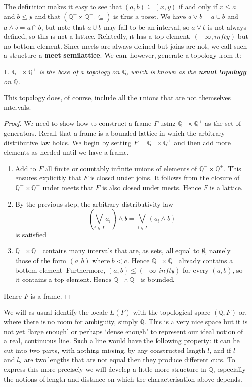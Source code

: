 \documentclass[oneside,english]{amsbook}
\numberwithin{section}{chapter}
\theoremstyle{plain}
\newtheorem{thm}{\protect\theoremname}
\theoremstyle{definition}
\providecommand{\theoremname}{Theorem}
\begin{document}
The definition makes it easy to see that $(a, b)\subseteq (x, y)$ if and only if $x\le a$ and $b\le y$ and that $(\mathbb{Q}^-\times\mathbb{Q}^+, \subseteq)$ is thus a poset. We have $a\lor b = a\cup b$ and $a\land b = a\cap b$, but note that $a\cup b$ may fail to be an interval, so $a\lor b$ is not always defined, so this is not a lattice. Relatedly, it has a top element, $(-\infty, infty)$ but no bottom element. Since meets are always defined but joins are not, we call such a structure a \textbf{meet semilattice}. We can, however, generate a topology from it:

\begin{thm}$\mathbb{Q}^-\times\mathbb{Q}^+$ is the base of a topology on $\mathbb{Q}$, which is known as the \textbf{usual topology} on $\mathbb{Q}$.
\end{thm}

This topology does, of course, include all the unions that are not themselves intervals.

\begin{proof}
	We need to show how to construct a frame $F$ using $\mathbb{Q}^-\times\mathbb{Q}^+$ as the set of generators. Recall that a frame is a bounded lattice in which the arbitrary distributive law holds. We begin by setting $F=\mathbb{Q}^-\times\mathbb{Q}^+$ and then add more elements as needed until we have a frame.
	\begin{enumerate}
		\item Add to $F$ all finite or countably infinite unions of elements of $\mathbb{Q}^-\times\mathbb{Q}^+$. This ensures explicitly that $F$ is closed under joins. It follows from the closure of $\mathbb{Q}^-\times\mathbb{Q}^+$ under meets that $F$ is also closed under meets. Hence $F$ is a lattice.
		\item By the previous step, the arbitrary distributivity law
			\[ (\bigvee_{i\in I}a_{i})\land b=\bigvee_{i\in I}(a_{i}\land b) \]
			is satisfied.
		\item $\mathbb{Q}^-\times\mathbb{Q}^+$ contains many intervals that are, as sets, all equal to $\emptyset$, namely those of the form $(a, b)$ where $b<a$. Hence $\mathbb{Q}^-\times\mathbb{Q}^+$ already contains a bottom element. Furthermore, $(a, b)\le (-\infty, infty)$ for every $(a, b)$, so it contains a top element. Hence $\mathbb{Q}^-\times\mathbb{Q}^+$ is bounded.
	\end{enumerate}
	Hence $F$ is a frame.
\end{proof}

We will as usual identify the locale $L(F)$ with the topological space $(\mathbb{Q}, F)$ or, where there is no room for ambiguity, simply $\mathbb{Q}$. This is a very nice space but it is not yet `large enough' or perhaps `dense enough' to represent our ideal notion of a real, continuous line. Such a line would have the following property: it can be cut into two parts, with nothing missing, by any constructed length $l$, and if $l_1$ and $l_2$ are two lengths that are not equal then they produce different cuts. To express this more precisely we will develop a little more structure in $\mathbb{Q}$, especially the notions of length and distance on which the characterisation above depends.
\end{document}
